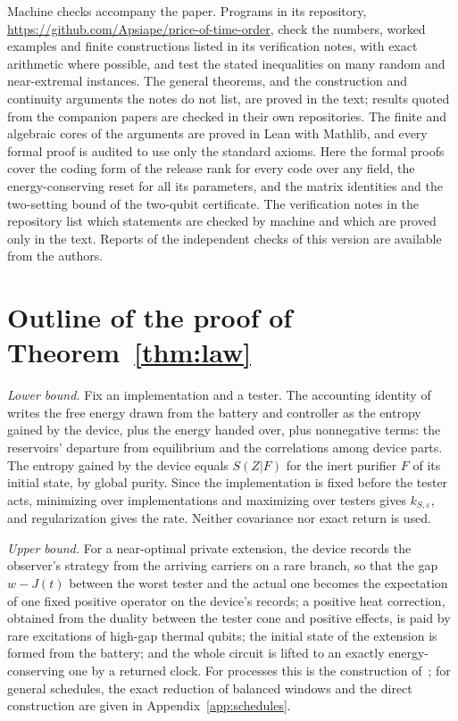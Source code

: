 \documentclass[11pt]{article}
\theoremstyle{definition}
\theoremstyle{remark}
\begin{document}
Machine checks accompany the paper. Programs in its repository, \url{https://github.com/Apsiape/price-of-time-order}, check the numbers, worked examples and finite constructions listed in its verification notes, with exact arithmetic where possible, and test the stated inequalities on many random and near-extremal instances. The general theorems, and the construction and continuity arguments the notes do not list, are proved in the text; results quoted from the companion papers are checked in their own repositories. The finite and algebraic cores of the arguments are proved in Lean with Mathlib, and every formal proof is audited to use only the standard axioms. Here the formal proofs cover the coding form of the release rank for every code over any field, the energy-conserving reset for all its parameters, and the matrix identities and the two-setting bound of the two-qubit certificate. The verification notes in the repository list which statements are checked by machine and which are proved only in the text. Reports of the independent checks of this version are available from the authors.

\FloatBarrier
\appendix
\section{Outline of the proof of Theorem~\ref{thm:law}}\label{app:law}

\emph{Lower bound.} Fix an implementation and a tester. The accounting identity of~\cite{SaveWork} writes the free energy drawn from the battery and controller as the entropy gained by the device, plus the energy handed over, plus nonnegative terms: the reservoirs' departure from equilibrium and the correlations among device parts. The entropy gained by the device equals $S(Z|F)$ for the inert purifier $F$ of its initial state, by global purity. Since the implementation is fixed before the tester acts, minimizing over implementations and maximizing over testers gives $k_{S,\varepsilon}$, and regularization gives the rate. Neither covariance nor exact return is used.

\emph{Upper bound.} For a near-optimal private extension, the device records the observer's strategy from the arriving carriers on a rare branch, so that the gap $w-J(t)$ between the worst tester and the actual one becomes the expectation of one fixed positive operator on the device's records; a positive heat correction, obtained from the duality between the tester cone and positive effects, is paid by rare excitations of high-gap thermal qubits; the initial state of the extension is formed from the battery; and the whole circuit is lifted to an exactly energy-conserving one by a returned clock. For processes this is the construction of~\cite{Answering}; for general schedules, the exact reduction of balanced windows and the direct construction are given in Appendix~\ref{app:schedules}.
\end{document}

